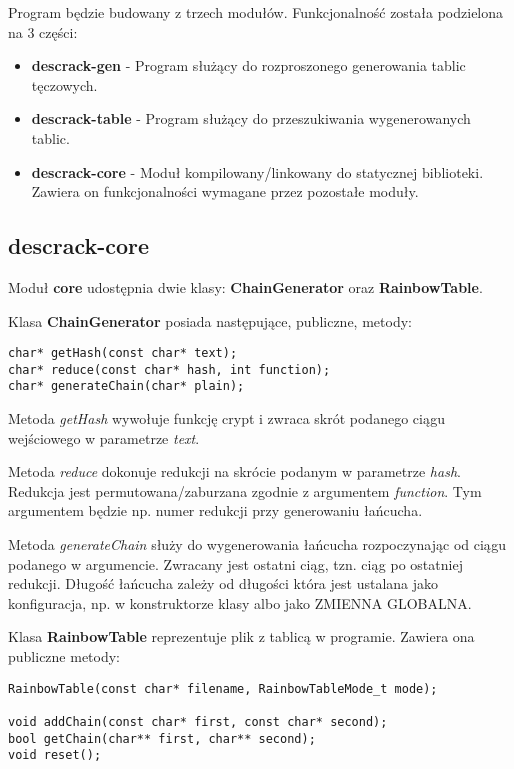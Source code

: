 \documentclass[a4paper,11pt]{article}
\begin{document}
Program będzie budowany z trzech modułów. Funkcjonalność została podzielona na 3 części:
\begin{itemize}
	\item \textbf{descrack-gen} - Program służący do rozproszonego generowania tablic tęczowych.
	\item \textbf{descrack-table} - Program służący do przeszukiwania wygenerowanych tablic.
	\item \textbf{descrack-core} - Moduł kompilowany/linkowany do statycznej biblioteki. Zawiera on funkcjonalności wymagane przez pozostałe moduły.
\end{itemize}

\subsection{descrack-core}

Moduł \textbf{core} udostępnia dwie klasy: \textbf{ChainGenerator} oraz \textbf{RainbowTable}. 

Klasa \textbf{ChainGenerator} posiada następujące, publiczne, metody:
\begin{lstlisting}
char* getHash(const char* text);
char* reduce(const char* hash, int function);
char* generateChain(char* plain);
\end{lstlisting}

Metoda \emph{getHash} wywołuje funkcję crypt i zwraca skrót podanego ciągu wejściowego w parametrze \emph{text}.

Metoda \emph{reduce} dokonuje redukcji na skrócie podanym w parametrze \emph{hash}. Redukcja jest permutowana/zaburzana zgodnie z argumentem \emph{function}. Tym argumentem będzie np. numer redukcji przy generowaniu łańcucha.

Metoda \emph{generateChain} służy do wygenerowania łańcucha rozpoczynając od ciągu podanego w argumencie. Zwracany jest ostatni ciąg, tzn. ciąg po ostatniej redukcji. Długość łańcucha zależy od długości która jest ustalana jako konfiguracja, np. w konstruktorze klasy albo jako ZMIENNA GLOBALNA.

Klasa \textbf{RainbowTable} reprezentuje plik z tablicą w programie. Zawiera ona publiczne metody:

\begin{lstlisting}
RainbowTable(const char* filename, RainbowTableMode_t mode);

void addChain(const char* first, const char* second);
bool getChain(char** first, char** second);
void reset();
\end{lstlisting}
\end{document}
